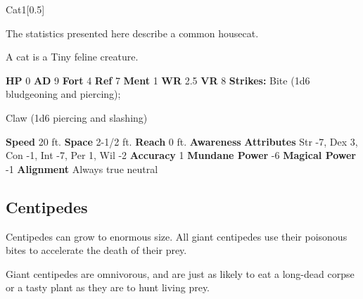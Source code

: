   
  \begin{monsection}{Cat}{1}[0.5]
    \vspace{-1em}\vspace{-1em}
    \vspace{0em}

    
      The statistics presented here describe a common housecat.
    
        A cat is a Tiny feline creature.
      

    \begin{spellcontent}
      \begin{spelltargetinginfo}
        \pari \textbf{HP} 0 \monsep
          \textbf{AD} 9 \monsep
          \textbf{Fort} 4 \monsep
          \textbf{Ref} 7 \monsep
          \textbf{Ment} 1
        \pari \textbf{WR} 2.5 \monsep
        \textbf{VR} 8
        \pari \textbf{Strikes:}
            Bite  (1d6 bludgeoning and piercing);
\par Claw  (1d6 piercing and slashing)
      \end{spelltargetinginfo}
    \end{spellcontent}
    \begin{monsterfooter}
      \pari \textbf{Speed} 20 ft. \monsep
        \textbf{Space} 2-1/2 ft. \monsep
        \textbf{Reach} 0 ft.
      \pari \textbf{Awareness} 
      \pari \textbf{Attributes}
        Str -7, Dex 3,
        Con -1, Int -7,
        Per 1, Wil -2
      \pari \textbf{Accuracy} 1 \monsep
        \textbf{Mundane Power} -6 \monsep
      \textbf{Magical Power} -1
      \pari \textbf{Alignment} Always true neutral
    \end{monsterfooter}
  \end{monsection}
  
  
    \subsection{Centipedes}
      
      Centipedes can grow to enormous size.
      All giant centipedes use their poisonous bites to accelerate the death of their prey.
    
      Giant centipedes are omnivorous, and are just as likely to eat a long-dead corpse or a tasty plant as they are to hunt living prey.
    

